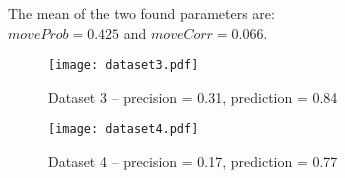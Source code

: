 The mean of the two found parameters are: \\$moveProb = 0.425$ and $moveCorr = 0.066$.

\begin{figure}[H]
\texttt{[image: dataset3.pdf]}
\caption{Dataset 3 --  precision = 0.31, prediction = 0.84}
\end{figure}

\begin{figure}[H]
\texttt{[image: dataset4.pdf]}
\caption{Dataset 4 --  precision = 0.17, prediction = 0.77}
\end{figure}
